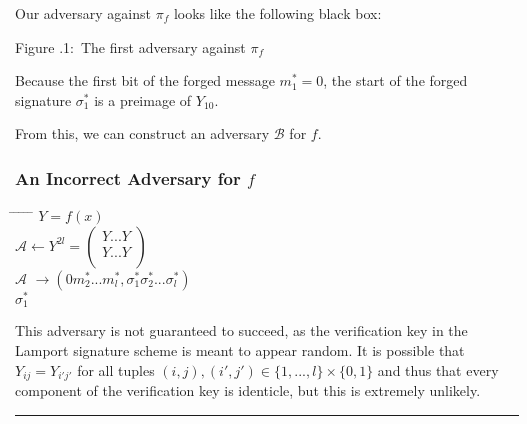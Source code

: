 \documentclass[twoside]{article}
\newcounter{lecnum}
\newcommand{\fig}[3]{
            \vspace{#2}
            \begin{center}
            Figure \thelecnum.#1:~#3
            \end{center}
    }
\newenvironment{proof}{{\bf Proof:}}{\hfill\rule{2mm}{2mm}}
\begin{document}
\begin{proof}
Our adversary against $\pi_f$ looks like the following black box:

\begin{center}
\end{center}
\fig{1}{0in}{The first adversary against $\pi_f$}

Because the first bit of the forged message $m^*_1 = 0$, the start of the forged signature $\sigma^*_1$ is a preimage of $Y_{10}$.

From this, we can construct an adversary $\mathcal{B}$ for $f$.

\subsubsection{An Incorrect Adversary for $f$}

\begin{tabbing}
\hspace*{.25in} \= \hspace*{.25in} \= \hspace*{.25in} \= \hspace*{.25in} \= \hspace*{.25in} \=\kill
{} $Y = f(x)$\\
\>$\mathcal{A} \leftarrow Y^{2l} = 
\begin{pmatrix}
Y...Y\\
Y...Y\\
\end{pmatrix}$\\
\>$\mathcal{A}$ $\rightarrow (0m^*_2...m^*_l,\sigma^*_1\sigma^*_2...\sigma^*_l)$\\
 $\sigma^*_1$
\end{tabbing}

This adversary is not guaranteed to succeed, as the verification key in the Lamport signature scheme is meant to appear random. It is possible that $Y_{ij} = Y_{i'j'}$ for all tuples $(i,j), (i', j') \in \{1,...,l\} \times \{0,1\}$ and thus that every component of the verification key is identicle, but this is extremely unlikely.


\end{proof}
\end{document}
